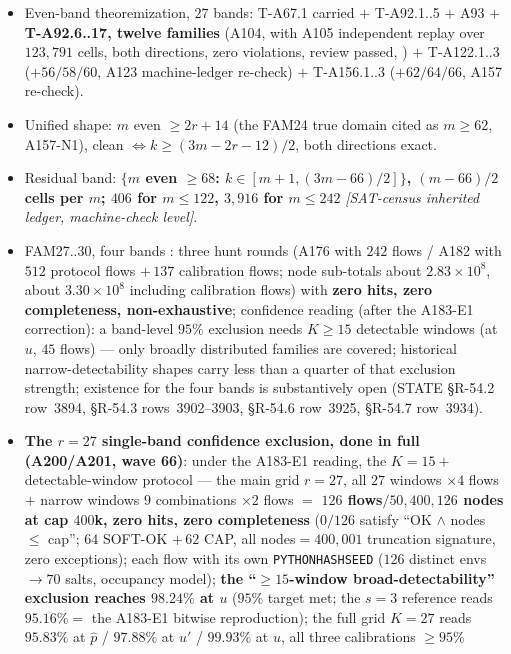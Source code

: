\begin{itemize}
\item Even-band theoremization, $27$ bands: T-A67.1 carried $+$
T-A92.1..5 $+$ A93 $+$ \textbf{T-A92.6..17, twelve families} (A104, with
A105 independent replay over $123{,}791$ cells, both directions, zero
violations, review passed, ) $+$
T-A122.1..3 ($+56/58/60$, A123 machine-ledger re-check) $+$
T-A156.1..3 ($+62/64/66$, A157 re-check).
\item Unified shape: $m$ even $\ge2r+14$ (the FAM24 true domain cited as
$m\ge62$, A157-N1), clean $\iff k\ge(3m-2r-12)/2$, both directions exact.
\item Residual band: \textbf{$\{m$ even $\ge68$: $k\in[m+1,(3m-66)/2]\}$,
$(m-66)/2$ cells per $m$; $406$ for $m\le122$, $3{,}916$ for
$m\le242$} \emph{[SAT-census inherited ledger, machine-check level]}.
\item FAM27..30, four bands \openlab: three hunt rounds (A176 with $242$
flows / A182 with $512$ protocol flows $+\,137$ calibration flows; node
sub-totals about $2.83\times10^8$, about $3.30\times10^8$ including
calibration flows) with \textbf{zero hits, zero completeness, non-exhaustive};
confidence reading (after the A183-E1 correction): a band-level $95\%$
exclusion needs $K\ge15$ detectable windows (at $u$, $45$ flows) --- only
broadly distributed families are covered; historical narrow-detectability
shapes carry less than a quarter of that exclusion strength; existence for
the four bands is substantively open (STATE \S R-54.2 row~3894, \S R-54.3
rows~3902--3903, \S R-54.6 row~3925, \S R-54.7 row~3934).
\item \textbf{The $r=27$ single-band confidence exclusion, done in full
(A200/A201, wave 66)}: under the A183-E1 reading, the $K=15+$
detectable-window protocol --- the main grid $r=27$, all $27$ windows
$\times4$ flows $+$ narrow windows $9$ combinations $\times2$ flows $=$
\textbf{$126$ flows$/50{,}400{,}126$ nodes at cap $400$k, zero hits, zero
completeness} ($0/126$ satisfy ``OK $\wedge$ nodes $\le$ cap'';
$64$ SOFT-OK $+\,62$ CAP, all nodes$=400{,}001$ truncation signature, zero
exceptions); each flow with its own \texttt{PYTHONHASHSEED} ($126$ distinct
envs $\to70$ salts, occupancy model); \textbf{the ``$\ge15$-window
broad-detectability'' exclusion reaches $98.24\%$ at $u$} ($95\%$ target
met; the $s=3$ reference reads $95.16\%=$ the A183-E1 bitwise
reproduction); the full grid $K=27$ reads $95.83\%$ at $\hat p$ /
$97.88\%$ at $u'$ / $99.93\%$ at $u$, all three calibrations $\ge95\%$

\end{itemize}
